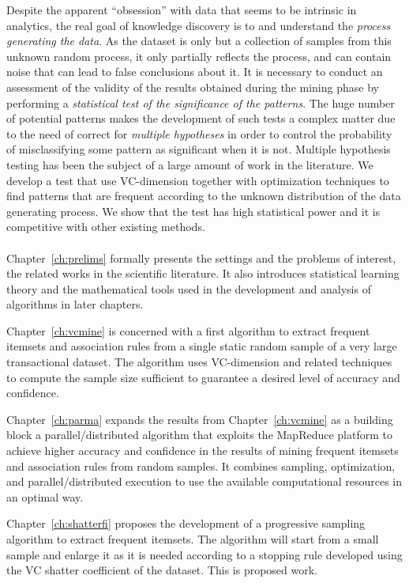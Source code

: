 Despite the apparent ``obsession'' with data that seems to be intrinsic in
analytics, the real goal of knowledge discovery is to and understand the
\emph{process generating the data}. As the dataset is only but a collection of
samples from this unknown random process, it only partially reflects the
process, and can contain noise that can lead to false conclusions about it. It
is necessary to conduct an assessment of the validity of the results obtained
during the mining phase by performing a \emph{statistical test of the
significance of the patterns}. The huge number of potential patterns makes the
development of such tests a complex matter due to the need of correct for
\emph{multiple hypotheses} in order to control the probability of misclassifying
some pattern as significant when it is not. Multiple hypothesis testing has been
the subject of a large amount of work in the literature. We develop a test that
use VC-dimension together with optimization techniques
to find patterns that are frequent according to the unknown distribution of the
data generating process. We show that the test has high statistical power and
it is competitive with other existing methods.

\paragraph*{}
Chapter~\ref{ch:prelims} formally presents the settings and the problems of
interest, the related works in the scientific literature. It also introduces
statistical learning theory and the mathematical tools used in the development
and analysis of algorithms in later chapters.

Chapter~\ref{ch:vcmine} is concerned with a first algorithm to extract frequent itemsets
and association rules from a single static random sample of a very large
transactional dataset. The algorithm uses VC-dimension and related techniques to
compute the sample size sufficient to guarantee a desired level of accuracy and
confidence.

Chapter~\ref{ch:parma} expands the results from
Chapter~\ref{ch:vcmine} as a building block a parallel/distributed algorithm
that exploits the MapReduce platform to achieve higher accuracy and confidence
in the results of mining frequent itemsets and association rules from random
samples. It combines sampling, optimization, and parallel/distributed execution
to use the available computational resources in an optimal way.

Chapter~\ref{ch:shatterfi} proposes the development of a progressive sampling
algorithm to extract frequent itemsets. The algorithm will start from a small
sample and enlarge it as it is needed according to a stopping rule developed
using the VC shatter coefficient of the dataset. This is proposed work.


